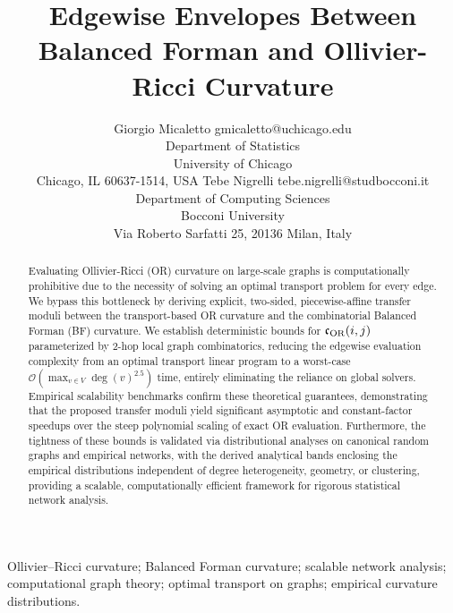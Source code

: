 \documentclass[twoside,11pt]{article}
\numberwithin{equation}{section}
\numberwithin{theorem}{section}
\numberwithin{example}{section}
\begin{document}
\title{Edgewise Envelopes Between Balanced Forman and Ollivier-Ricci Curvature}

\begingroup
\renewcommand\thefootnote{\fnsymbol{footnote}}
\setcounter{footnote}{0}

\author{\name Giorgio Micaletto
        \email gmicaletto@uchicago.edu\\
        \addr Department of Statistics\\
        University of Chicago\\
        Chicago, IL 60637-1514, USA
        \AND 
        \name Tebe Nigrelli
        \email tebe.nigrelli@studbocconi.it\\
        \addr Department of Computing Sciences\\ 
        Bocconi University\\
        Via Roberto Sarfatti 25, 20136 Milan, Italy
}
\begingroup
\makeatletter
\renewcommand\@makefntext[1]{%
\noindent\makebox[1.8em][r]{\!\@makefnmark:}\,#1%
}
\makeatother
\endgroup
\endgroup


\editor{
}

\maketitle


\begin{abstract}
Evaluating Ollivier-Ricci (OR) curvature on large-scale graphs is computationally prohibitive due to the necessity of solving an optimal transport problem for every edge. We bypass this bottleneck by deriving explicit, two-sided, piecewise-affine transfer moduli between the transport-based OR curvature and the combinatorial Balanced Forman (BF) curvature. We establish deterministic bounds for $\mathfrak{c}_{\rm OR}(i,j)$ parameterized by 2-hop local graph combinatorics, 
reducing the edgewise evaluation complexity from an optimal transport linear program to a worst-case $\mathcal{O}(\max_{v \in V} \deg(v)^{2.5})$ time, entirely eliminating the reliance on global solvers.
Empirical scalability benchmarks confirm these theoretical guarantees, demonstrating that the proposed transfer moduli yield significant asymptotic and constant-factor speedups over the steep polynomial scaling of exact OR evaluation. 
Furthermore, the tightness of these bounds is validated via distributional analyses on canonical random graphs and empirical networks, with the derived analytical bands enclosing the empirical distributions independent of degree heterogeneity, geometry, or clustering, providing a scalable, computationally efficient framework for rigorous statistical network analysis.
\end{abstract}
\begin{keywords}
Ollivier--Ricci curvature; Balanced Forman curvature; scalable network analysis; computational graph theory; optimal transport on graphs; empirical curvature distributions.
\end{keywords}
\end{document}
